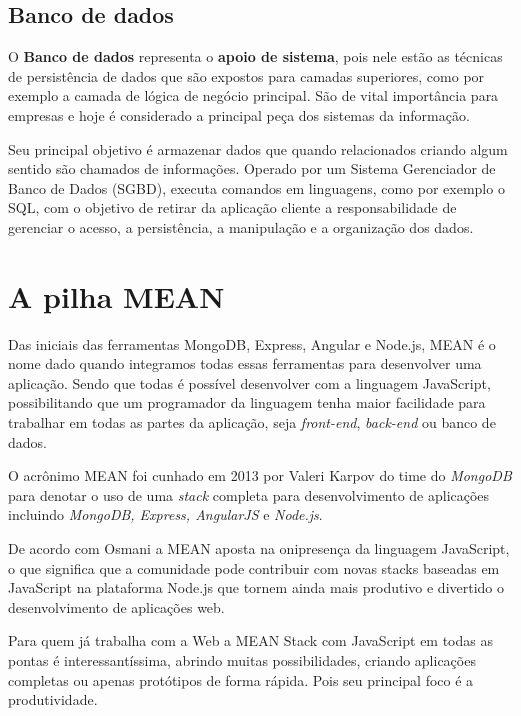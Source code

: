 \documentclass[
	12pt,				%
	openright,			%
	twoside,			%
	a4paper,			%
	english,			%
	brazil				%
	]{abntex2}
\begin{document}
\subsection{Banco de dados}
\label{subsec:BancoDeDados}

O \textbf{Banco de dados} representa o \textbf{apoio de sistema}, pois nele estão as técnicas de persistência de dados que são expostos para camadas superiores, como por exemplo a camada de lógica de negócio principal. São de vital importância para empresas e hoje é considerado a principal peça dos sistemas da informação.

Seu principal objetivo é armazenar dados que quando relacionados criando algum sentido são chamados de informações. Operado por um Sistema Gerenciador de Banco de Dados (SGBD), executa comandos em linguagens, como por exemplo o SQL, com o objetivo de retirar da aplicação cliente a responsabilidade de gerenciar o acesso, a persistência, a manipulação e a organização dos dados.

\section{A pilha MEAN}

Das iniciais das ferramentas MongoDB, Express, Angular e Node.js, MEAN é o nome dado quando integramos todas essas ferramentas para desenvolver uma aplicação. Sendo que todas é possível desenvolver com a linguagem JavaScript, possibilitando que um programador da linguagem tenha maior facilidade para trabalhar em todas as partes da aplicação, seja \textit{front-end}, \textit{back-end} ou banco de dados.

O acrônimo MEAN foi cunhado em 2013 por Valeri Karpov do time do \textit{MongoDB} \cite{karpov_mean} para denotar o uso de uma \textit{stack} completa para desenvolvimento de aplicações incluindo \textit{MongoDB, Express, AngularJS} e \textit{Node.js}.

De acordo com Osmani\cite{osmani_addy} a MEAN aposta na onipresença da linguagem JavaScript, o que significa que a comunidade pode contribuir com novas stacks baseadas em JavaScript na plataforma Node.js que tornem ainda mais produtivo e divertido o desenvolvimento de aplicações web.

Para quem já trabalha com a Web a MEAN Stack com JavaScript em todas as pontas é interessantíssima, abrindo muitas possibilidades, criando aplicações completas ou apenas protótipos de forma rápida. Pois seu principal foco é a produtividade.
\end{document}
